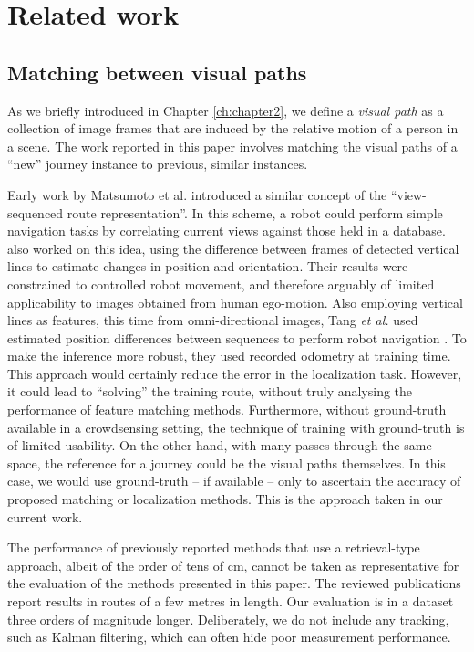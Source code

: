 \section{Related work}
\label{sec:retrieval}

\subsection{Matching between visual paths} As we briefly introduced in Chapter \ref{ch:chapter2}, we define a {\em visual path} as a collection of image frames that are induced by the relative motion of a person in a scene. The work reported in this paper involves matching the visual paths of a ``new'' journey instance to previous, similar instances. 

Early work by Matsumoto et al. \cite{Matsumoto1996} introduced a similar concept of the ``view-sequenced route representation''.  In this scheme,  a robot could perform simple navigation tasks by correlating current views against those held in a database. \citet{Ohno1996} also worked on this idea, using the difference between frames of detected vertical lines to estimate changes in position and orientation. Their results were constrained to controlled robot movement, and therefore arguably of limited applicability to images obtained from human ego-motion. Also employing vertical lines as features, this time from omni-directional images, Tang {\it et al.} used estimated position differences between sequences to perform  robot navigation \cite{Tang2001}. To make the inference more robust, they used recorded odometry at training time. This approach would certainly reduce the error in the localization task. However, it could lead to ``solving'' the training  route, without truly analysing the performance of feature matching methods. Furthermore, without ground-truth available in a crowdsensing setting, the technique of training with ground-truth is of limited usability.  On the other hand, with many passes through the same space, the reference for a journey could be the visual paths themselves. In this case, we would use ground-truth -- if available -- only to ascertain the accuracy of proposed matching or localization methods. This is the approach taken in our current work.

The performance of previously reported methods that use a retrieval-type approach, albeit of the order of tens of cm, cannot be taken as representative for the evaluation of the methods presented in this paper. The reviewed publications report results in routes of a few metres in length. Our evaluation is in a dataset three orders of magnitude longer.  Deliberately, we do not include any tracking, such as Kalman filtering, which can often hide poor measurement performance. 

